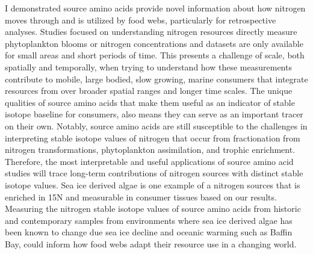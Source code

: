 \documentclass [11pt, proquest] {uwthesis}[2015/03/03]
\begin{document}
I demonstrated source amino acids provide novel information about how
nitrogen moves through and is utilized by food webs, particularly for
retrospective analyses. Studies focused on understanding nitrogen
resources directly measure phytoplankton blooms or nitrogen
concentrations and datasets are only available for small areas and short
periods of time. This presents a challenge of scale, both spatially and
temporally, when trying to understand how these measurements contribute
to mobile, large bodied, slow growing, marine consumers that integrate
resources from over broader spatial ranges and longer time scales. The
unique qualities of source amino acids that make them useful as an
indicator of stable isotope baseline for consumers, also means they can
serve as an important tracer on their own. Notably, source amino acids
are still susceptible to the challenges in interpreting stable isotope
values of nitrogen that occur from fractionation from nitrogen
transformations, phytoplankton assimilation, and trophic enrichment.
Therefore, the most interpretable and useful applications of source
amino acid studies will trace long-term contributions of nitrogen
sources with distinct stable isotope values. Sea ice derived algae is
one example of a nitrogen sources that is enriched in 15N and measurable
in consumer tissues based on our results. Measuring the nitrogen stable
isotope values of source amino acids from historic and contemporary
samples from environments where sea ice derived algae has been known to
change due sea ice decline and oceanic warming such as Baffin Bay, could
inform how food webs adapt their resource use in a changing world.
\end{document}
